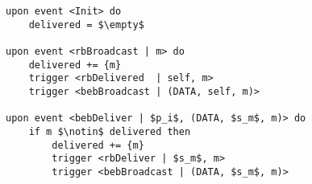 \begin{lstlisting}[mathescape, caption= Eager reliable broadcast, captionpos=b]
upon event <Init> do
    delivered = $\empty$

upon event <rbBroadcast | m> do
    delivered += {m}
    trigger <rbDelivered  | self, m>
    trigger <bebBroadcast | (DATA, self, m)>

upon event <bebDeliver | $p_i$, (DATA, $s_m$, m)> do
    if m $\notin$ delivered then
        delivered += {m}
        trigger <rbDeliver | $s_m$, m>
        trigger <bebBroadcast | (DATA, $s_m$, m)>
\end{lstlisting}
